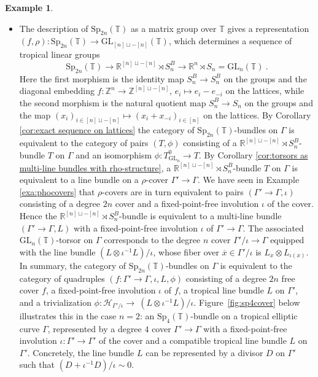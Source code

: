 \documentclass[10pt, a4paper]{amsart}
\theoremstyle{definition}
\newtheorem{example}[theorem]{Example}
\theoremstyle{myitemstyle}
\newcommand{\R}{\mathbb{R}}
\newcommand{\ZZ}{\mathbb{Z}}
\newcommand{\TT}{\mathbb{T}}
\newcommand{\T}{\mathbb{T}}
\newcommand{\mc}[1]{{\mathcal{#1}}}
\newcommand{\GL}{{\mathrm{GL}}}
\newcommand{\Sp}{{\mathrm{Sp}}}
\newcommand{\Ga}{\Gamma}
\begin{document}
\begin{example}
\begin{itemize}
        \item[$\Sp_{2n}$:] The description of $\Sp_{2n}(\TT)$ as a matrix group over $\TT$ gives a representation $(f,\rho):\Sp_{2n}(\TT)\to \GL_{[n]\sqcup -[n]}(\TT)$, which determines a sequence of tropical linear groups
        \[
            \Sp_{2n}(\TT) \longrightarrow
                \R^{[n]\sqcup -[n]}\rtimes S_n^B \longrightarrow 
                \R^n \rtimes S_n=\GL_n(\TT)\ .
        \]
        Here the first morphism is the identity map $S_n^B\to S_n^B$ on the groups and the diagonal embedding $f:\ZZ^n\to \ZZ^{[n]\sqcup -[n]}$, $e_i\mapsto e_i-e_{-i}$ on the lattices, while the second morphism is the natural quotient map $S_n^B\to S_n$ on the groups and the map $(x_i)_{i\in [n]\sqcup -[n]}\mapsto (x_i+x_{-i})_{i\in [n]}$ on the lattices. By Corollary \ref{cor:exact sequence on lattices} the category of $\Sp_{2n}(\T)$-bundles on $\Ga$ is equivalent to the category of pairs $(T,\phi)$ consisting of a $\R^{[n]\sqcup -[n]}\rtimes S_n^B$-bundle $T$ on $\Ga$ and an isomorphism $\phi:T_{\GL_n}^0\to T$. By Corollary \ref{cor:torsors as multi-line bundles with rho-structure}, a $\R^{[n]\sqcup -[n]}\rtimes S_n^B$-bundle $T$ on $\Ga$ is equivalent to a line bundle on a $\rho$-cover $\Ga'\to \Ga$. We have seen in Example \ref{exa:phocovers} that $\rho$-covers are in turn equivalent to pairs $(\Gamma'\to \Gamma ,\iota)$ consisting of a degree $2n$ cover and a fixed-point-free involution $\iota$ of the cover. Hence the $\R^{[n]\sqcup -[n]}\rtimes S_n^B$-bundle is equivalent to a multi-line bundle $(\Gamma'\to \Gamma, L)$ with a fixed-point-free involution $\iota$ of $\Gamma'\to \Gamma$. The associated $\GL_n(\TT)$-torsor on $\Ga$ corresponds to the degree $n$ cover $\Gamma'/\iota\to \Gamma$ equipped with the line bundle $(L\otimes \iota^{-1} L)/\iota$, whose fiber over $\overline x\in \Gamma'/\iota$ is $L_x\otimes L_{\iota(x)}$. 
        In summary, the category of $\Sp_{2n}(\TT)$-bundles on $\Ga$ is equivalent to the category of quadruples $(f:\Gamma'\to \Gamma, \iota, L, \phi)$ consisting of a degree $2n$ free cover $f$, a fixed-point-free involution $\iota$ of $f$, a tropical line bundle $L$ on $\Gamma'$, and a trivialization $\phi:\mc H_{\Gamma'/\iota}\to \ (L\otimes \iota^{-1}L)/\iota$. Figure~\ref{fig:sp4cover} below illustrates this in the case $n=2$: an  $\Sp_4(\TT)$-bundle on a tropical elliptic curve $\Ga$, represented by a degree $4$ cover $\Ga' \to \Ga$ with a fixed-point-free involution $\iota:\Gamma' \to \Gamma'$ of the cover and a compatible tropical line bundle $L$ on $\Ga'$. Concretely, the line bundle $L$ can be represented by a divisor $D$ on $\Gamma'$ such that $(D + \iota^{-1}D)/\iota \sim 0$.


\end{itemize}
\end{example}
\end{document}
